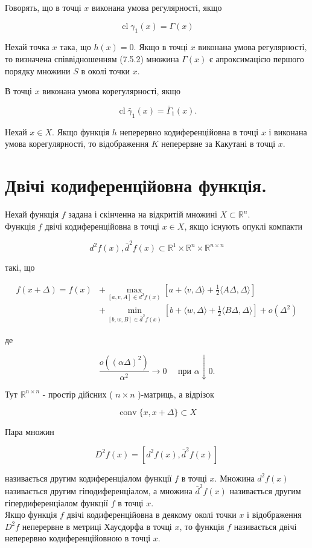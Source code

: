 \documentclass[10pt]{article}
\begin{document}
Говорять, що в точці $x$ виконана умова регулярності, якщо

$$
\operatorname{cl} \gamma_{1}(x)=\Gamma(x)
$$

Нехай точка $x$ така, що $h(x)=0$. Якщо в точці $x$ виконана умова регулярності, то визначена співвідношенням (7.5.2) множина $\Gamma(x)$ є апроксимацією першого порядку множини $S$ в околі точки $x$.

В точці $x$ виконана умова корегулярності, якщо

$$
\operatorname{cl} \bar{\gamma}_{1}(x)=\bar{\Gamma}_{1}(x) .
$$

Нехай $x \in X$. Якщо функція $h$ неперервно кодиференційовна в точці $x$ і виконана умова корегулярності, то відображення $K$ неперервне за Какутані в точці $x$.

\section*{Двічі кодиференційовна функція.}
Нехай функція $f$ задана і скінченна на відкритій множині $X \subset \mathbb{R}^{n}$.\\
Функція $f$ двічі кодиференційовна в точці $x \in X$, якщо існують опуклі компакти

$$
d^{2} f(x), \bar{d}^{2} f(x) \subset \mathbb{R}^{1} \times \mathbb{R}^{n} \times \mathbb{R}^{n \times n}
$$

такі, що

$$
\begin{aligned}
f(x+\Delta)=f(x) & +\max _{[a, v, A] \in d^{2} f(x)}\left[a+\langle v, \Delta\rangle+\frac{1}{2}\langle A \Delta, \Delta\rangle\right] \\
& +\min _{[b, w, B] \in \bar{d}^{2} f(x)}\left[b+\langle w, \Delta\rangle+\frac{1}{2}\langle B \Delta, \Delta\rangle\right]+o\left(\Delta^{2}\right)
\end{aligned}
$$

де

$$
\frac{o\left((\alpha \Delta)^{2}\right)}{\alpha^{2}} \rightarrow 0 \quad \text { при } \alpha \downarrow 0 .
$$

Тут $\mathbb{R}^{n \times n}$ - простір дійсних ( $n \times n$ )-матриць, а відрізок

$$
\operatorname{conv}\{x, x+\Delta\} \subset X
$$

Пара множин

$$
D^{2} f(x)=\left[d^{2} f(x), \bar{d}^{2} f(x)\right]
$$

називається другим кодиференціалом функції $f$ в точці $x$. Множина $d^{2} f(x)$ називається другим гіподиференціалом, а множина $\bar{d}^{2} f(x)$ називається другим гіпердиференціалом функції $f$ в точці $x$.\\
Якщо функція $f$ двічі кодиференційовна в деякому околі точки $x$ і відображення $D^{2} f$ неперервне в метриці Хаусдорфа в точці $x$, то функція $f$ називається двічі неперервно кодиференційовною в точці $x$.
\end{document}
